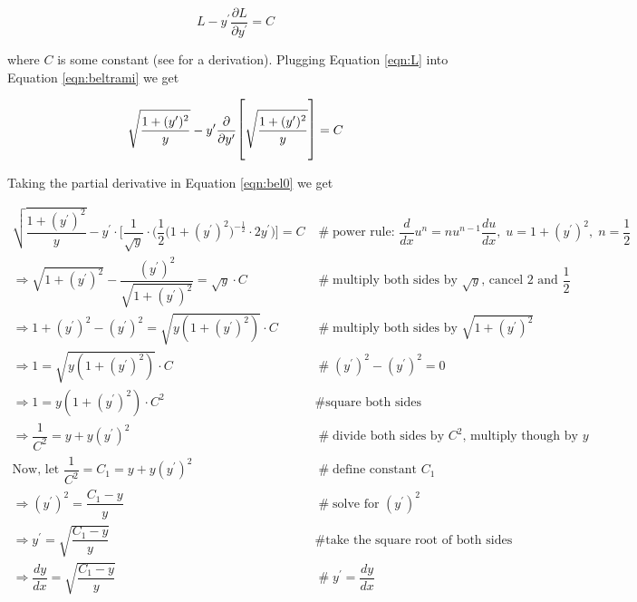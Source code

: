 \documentclass{article}
\theoremstyle{definition}
\begin{document}
\bigskip
\begin{equation}
L - y^{\prime} \dfrac{\partial L}{\partial y^{\prime}} = C
\label{eqn:beltrami}
\end{equation}

\bigskip
\noindent
where $C$ is some constant (see \cite{wiki:beltrami_identity} for
a derivation). Plugging Equation \ref{eqn:L} into Equation
\ref{eqn:beltrami} we get

\bigskip
\begin{equation}
\sqrt{\dfrac{1 + (y^{\prime})^2}{y}} - y^{\prime} 
\dfrac{\partial}{\partial y^{\prime}} 
\mathlarger{\mathlarger{\Bigg [}} \sqrt{\dfrac{1 + (y^{\prime})^2}{y}} \mathlarger{\mathlarger{\Bigg ]}} 
= C
\label{eqn:bel0}
\end{equation}


\bigskip
\noindent
Taking the partial derivative in Equation \ref{eqn:bel0} we get

\medskip
\begin{equation*}
\begin{array}{lllll}
\sqrt{\dfrac{1 + (y^{\prime})^2}{y}}  - y^{\prime} \cdot 
\Bigg [
  \dfrac{1}{\sqrt{y}} \cdot
  \bigg ( 
    \dfrac{1}{2} \Big (1 + (y^{\prime})^2 \Big )^{- \frac{1}{2}} 
    \cdot 2 y^{\prime} 
  \bigg )
\Bigg ]
= C							&\mathrel{\#} \text{power rule: $\dfrac{d}{dx} u^n = n u^{n-1} \dfrac{du}{dx}, \; u= 1 + (y^{\prime})^2, \; n = \dfrac{1}{2}$} \\
[15pt]
\Rightarrow \sqrt{1 + (y^{\prime})^2} - \dfrac{(y^{\prime})^2}{\sqrt{1 + (y^{\prime})^2}} = \sqrt{y} \cdot C
							&\mathrel{\#} \text{multiply both sides by $\sqrt{y}$, cancel 2 and $\dfrac{1}{2}$} \\
[15pt]
\Rightarrow 1 + (y^{\prime})^2 -(y^{\prime})^2 = \sqrt{y (1 + (y^{\prime})^2)} \cdot C
							&\mathrel{\#} \text{multiply both sides by $\sqrt{1 + (y^{\prime})^2}$} \\
[15pt]
\Rightarrow 1 = \sqrt{y (1 + (y^{\prime})^2)} \cdot C
							&\mathrel{\#} (y^{\prime})^2 - (y^{\prime})^2 = 0 \\
[15pt]
\Rightarrow 1 = y (1 + (y^{\prime})^2) \cdot C^2
							&\mathrel{\#} \text{square both sides} \\
[15pt]
\Rightarrow \dfrac{1}{C^2} = y + y (y^{\prime})^2
							&\mathrel{\#} \text{divide both sides by $C^2$, multiply though by $y$} \\
[15pt]
\text{Now, let } \dfrac{1}{C^2} = C_1 = y + y (y^{\prime})^2
							&\mathrel{\#} \text{define constant $C_1$} \\
[15pt]
\Rightarrow (y^{\prime})^2 = \dfrac{C_1 - y}{y}
							&\mathrel{\#} \text{solve for $(y^{\prime})^2$} \\
[15pt]
\Rightarrow y^{\prime} = \sqrt{\dfrac{C_1 - y}{y}}
							&\mathrel{\#} \text{take the square root of both sides} \\
[15pt]
\Rightarrow \dfrac{dy}{dx} = \sqrt{\dfrac{C_1 - y}{y}}
							&\mathrel{\#} y^{\prime} = \dfrac{dy}{dx} \\

\end{array}
\end{equation*}
						
\end{document}
